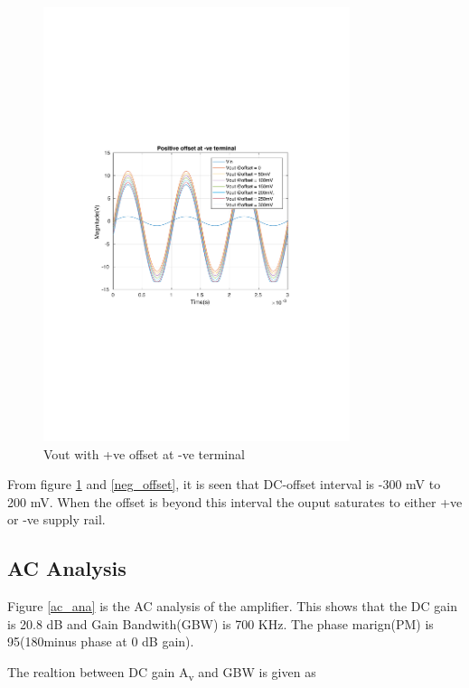 \documentclass[12pt,a4paper,UKenglish]{article}
\begin{document}
\begin{figure} [H]
  \centering 
  \includegraphics[width=0.8\textwidth]{img/1a_offset_pos.pdf} 
  \caption{Vout with +ve offset at -ve terminal}
  \label{pos_offset} 
\end{figure}

From figure \ref{pos_offset} and \ref{neg_offset}, it is seen that DC-offset interval is -300 mV to 200 mV. When the offset is beyond this interval the ouput saturates to either +ve or -ve supply rail. \\

\subsection{AC Analysis}
Figure   \ref{ac_ana}  is the AC analysis of the amplifier. This shows that the DC gain is 20.8 dB and Gain Bandwith(GBW) is 700 KHz. The phase marign(PM) is 95\textdegree (180\textdegree minus phase at 0 dB gain). 

The realtion between DC gain A\textsubscript{v} and GBW is given as 
\end{document}
